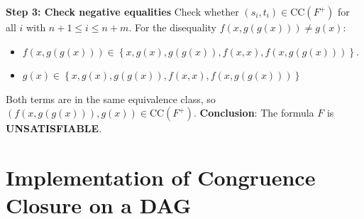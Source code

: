 \documentclass[a4paper]{article}
\theoremstyle{definition}
\begin{document}
\textbf{Step 3: Check negative equalities}
\vspace{1em}
\noindent
\newline
Check whether \( (s_i, t_i) \in \mathrm{CC}(F^+) \) for all \( i \) with \( n + 1 \leq i \leq n + m \).
\vspace{1em}
\noindent
\newline
For the disequality \( f(x,g(g(x))) \neq g(x) \):
\begin{itemize}
	\item \( f(x,g(g(x))) \in \left\{ x,g(x),g(g(x)),f(x,x),f(x,g(g(x))) \right\} \).
	\item \( g(x) \in \left\{x,g(x),g(g(x)),f(x,x),f(x,g(g(x))) \right\} \)
\end{itemize}
Both terms are in the same equivalence class, so \( (f(x,g(g(x))), g(x)) \in \mathrm{CC}(F^+) \).
\vspace{1em}
\noindent
\newline
\textbf{Conclusion}: The formula \( F \) is \textbf{UNSATISFIABLE}.
\section{Implementation of Congruence Closure on a DAG}
\end{document}
